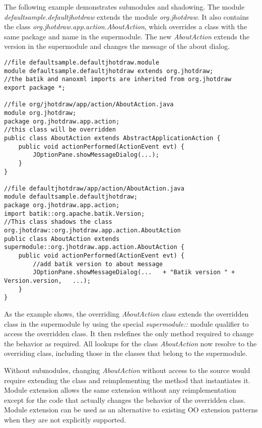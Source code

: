 The following example demonstrates submodules and shadowing. The module
\textit{defaultsample.defaultjhotdraw} extends the module \textit{org.jhotdraw}. 
It also contains the class \textit{org.jhotdraw.app.action.AboutAction},
which overrides a class with the same package and name in the supermodule.
The new \textit{AboutAction} extends the version in the supermodule and
changes the message of the about dialog.

\begin{lstlisting}[caption=Module Subtyping]
//file defaultsample.defaultjhotdraw.module 
module defaultsample.defaultjhotdraw extends org.jhotdraw;
//the batik and nanoxml imports are inherited from org.jhotdraw
export package *;

//file org/jhotdraw/app/action/AboutAction.java
module org.jhotdraw;
package org.jhotdraw.app.action;
//this class will be overridden
public class AboutAction extends AbstractApplicationAction {
	public void actionPerformed(ActionEvent evt) {
		JOptionPane.showMessageDialog(...);
	}
}

//file defaultjhotdraw/app/action/AboutAction.java
module defaultsample.defaultjhotdraw;
package org.jhotdraw.app.action;
import batik::org.apache.batik.Version;
//This class shadows the class org.jhotdraw::org.jhotdraw.app.action.AboutAction
public class AboutAction extends supermodule::org.jhotdraw.app.action.AboutAction {
	public void actionPerformed(ActionEvent evt) {
		//add batik version to about message
		JOptionPane.showMessageDialog(...	+ "Batik version " + Version.version,	...);
	}
}

\end{lstlisting}

As the example shows, the overriding \textit{AboutAction} class extends the
overridden class in the supermodule by using the special 
\textit{supermodule::} module qualifier to access the overridden class. It
then redefines the only method required to change the behavior as required.
All lookups for the class \textit{AboutAction} now resolve to the overriding
class, including those in the classes that belong to the supermodule.

Without submodules, changing \textit{AboutAction} without access to the source
would require extending the class and reimplementing the method 
that instantiates it. Module extension allows the same extension without
any reimplementation except for the code that actually changes the behavior of the overridden class.
Module extension can be used as an alternative to existing OO extension patterns when they
are not explicitly supported. 

